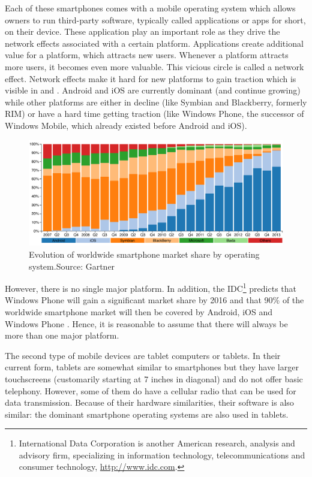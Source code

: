 Each of these smartphones comes with a mobile operating system which allows owners to run third-party software, typically called applications or apps for short, on their device. These application play an important role as they drive the network effects associated with a certain platform. Applications create additional value for a platform, which attracts new users. Whenever a platform attracts more users, it becomes even more valuable. This vicious circle is called a network effect. Network effects make it hard for new platforms to gain traction which is visible in  and . Android and iOS are currently dominant (and continue growing) while other platforms are either in decline (like Symbian and Blackberry, formerly RIM) or have a hard time getting traction (like Windows Phone, the successor of Windows Mobile, which already existed before Android and iOS).

\begin{figure}[h]
    \centering
    \includegraphics[width=\textwidth]{figs/smartphone_share.pdf}
    \caption{Evolution of worldwide smartphone market share by operating system.\newline Source: Gartner \citeGartner}
    \label{fig:smartphone-share}
\end{figure}

However, there is no single major platform. In addition, the IDC\footnote{International Data Corporation is another American research, analysis and advisory firm, specializing in information technology, telecommunications and consumer technology, \url{http://www.idc.com}.} predicts that Windows Phone will gain a significant market share by 2016 and that 90\% of the worldwide smartphone market will then be covered by Android, iOS and Windows Phone \cite{IDC:phone}. Hence, it is reasonable to assume that there will always be more than one major platform.

The second type of mobile devices are tablet computers or tablets. In their current form, tablets are somewhat similar to smartphones but they have larger touchscreens (customarily starting at 7 inches in diagonal) and do not offer basic telephony. However, some of them do have a cellular radio that can be used for data transmission. Because of their hardware similarities, their software is also similar: the dominant smartphone operating systems are also used in tablets.


